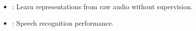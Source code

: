 \begin{frame}
\begin{columns}[t]
\begin{column}{0.40\textwidth}
{\begin{itemize}
                \item {}: Learn representations from raw audio without supervision.
                \item {}: Speech recognition performance.
            \end{itemize}
            }
        \end{column}
        \begin{column}{0.30\textwidth}
            \begin{figure}[2.333\textwidth]
            \end{figure}
        \end{column}
        \hspace{0.020\textwidth}
    \end{columns}
    
\end{frame}


